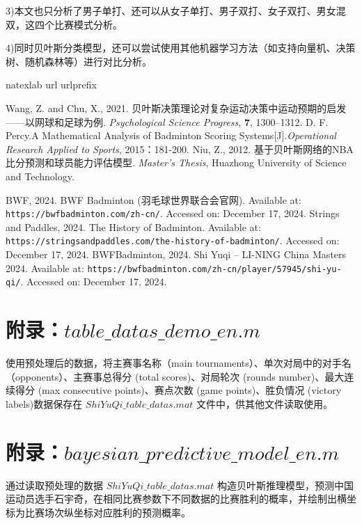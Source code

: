 \documentclass[12pt]{article}
\begin{document}
3)本文也只分析了男子单打、还可以从女子单打、男子双打、女子双打、男女混双，这四个比赛模式分析。

4)同时贝叶斯分类模型，还可以尝试使用其他机器学习方法（如支持向量机、决策树、随机森林等）进行对比分析。


\begin{thebibliography}{100}
	\expandafter\ifx\csname natexlab\endcsname\relax\def\natexlab#1{#1}\fi
	\expandafter\ifx\csname url\endcsname\relax
	\def\url#1{\texttt{#1}}\fi
	\expandafter\ifx\csname urlprefix\endcsname\relax\def\urlprefix{URL }\fi

Wang, Z. and Chu, X., 2021. 贝叶斯决策理论对复杂运动决策中运动预期的启发——以网球和足球为例. \textit{Psychological Science Progress}, \textbf{7}, 1300–1312.
D. F. Percy.A Mathematical Analysis of Badminton Scoring Systems[J].\textit{Operational Research Applied to Sports}, 2015：181-200.
Niu, Z., 2012. 基于贝叶斯网络的NBA比分预测和球员能力评估模型. \textit{Master's Thesis}, Huazhong University of Science and Technology.


BWF, 2024. BWF Badminton (羽毛球世界联合会官网). Available at: \url{https://bwfbadminton.com/zh-cn/}. Accessed on: December 17, 2024.
Strings and Paddles, 2024. The History of Badminton. Available at: \url{https://stringsandpaddles.com/the-history-of-badminton/}. Accessed on: December 17, 2024.
BWFBadminton, 2024. Shi Yuqi – LI-NING China Masters 2024. Available at: \url{https://bwfbadminton.com/zh-cn/player/57945/shi-yu-qi/}. Accessed on: December 17, 2024.

\end{thebibliography}

\appendix
\section{附录：$table\_datas\_demo\_en.m$}
使用预处理后的数据，将主赛事名称（main tournaments）、单次对局中的对手名（opponents）、主赛事总得分 (total scores)、对局轮次 (rounds number)、最大连续得分 (max consecutive points)、赛点次数 (game points)、胜负情况 (victory labels)数据保存在 $ShiYuQi\_table\_datas.mat$ 文件中，供其他文件读取使用。




\section{附录：$bayesian\_predictive\_model\_en.m$}
通过读取预处理的数据 $ShiYuQi\_table\_datas.mat$ 构造贝叶斯推理模型，预测中国运动员选手石宇奇，在相同比赛参数下不同数据的比赛胜利的概率，并绘制出横坐标为比赛场次纵坐标对应胜利的预测概率。


\end{document}
